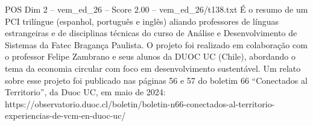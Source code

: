 \begin{textsample}{POS Dim 2 – vem\_ed\_26 – Score 2.00 – vem\_ed\_26/t138.txt}
É o resumo de um PCI trilíngue (espanhol, português e inglês) aliando professores de línguas estrangeiras e de disciplinas técnicas do curso de Análise e Desenvolvimento de Sistemas da Fatec Bragança Paulista.
O projeto foi realizado em colaboração com o professor Felipe Zambrano e seus alunos da DUOC UC (Chile), abordando o tema da economia circular com foco em desenvolvimento sustentável.
Um relato sobre esse projeto foi publicado nas páginas 56 e 57 do boletim 66 “Conectados al Territorio”, da Duoc UC, em maio de 2024: https://observatorio.duoc.cl/boletin/boletin-n66-conectados-al-territorio-experiencias-de-vcm-en-duoc-uc/

\end{textsample}
